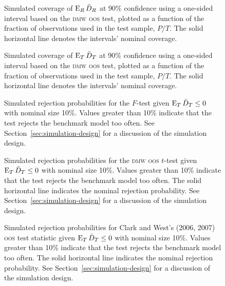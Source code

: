 \documentclass[11pt]{article}
\begin{document}
\clearpage
\begin{figure}
\caption{Simulated coverage of $\operatorname{E}_R \bar{D}_{R}$ at 90\% confidence using a
  one-sided interval based on the \protect\textsc{dmw}
  \protect\textsc{oos} test, plotted as a function of the fraction of
  observations used in the test sample, $P/T$.  The solid horizontal
  line denotes the intervals' nominal coverage.}
 \label{fig:interval-R}
\end{figure}
\clearpage
\begin{figure}
\caption{Simulated coverage of $\operatorname{E}_T \bar{D}_{T}$ at 90\% confidence using a
  one-sided interval based on the \protect\textsc{dmw}
  \protect\textsc{oos} test, plotted as a function of the fraction of
  observations used in the test sample, $P/T$.  The solid horizontal
  line denotes the intervals' nominal coverage.}
\label{fig:interval-T}
\end{figure}
\clearpage

\begin{figure}
  
  \caption{Simulated rejection probabilities for the $F$-test given
    $\operatorname{E}_T \bar{D}_{T} \leq 0$ with nominal size 10\%.  Values greater than
    10\% indicate that the test rejects the benchmark model too often.
    See Section~\ref{sec:simulation-design} for a discussion of the
    simulation design.}
  \label{fig:ftest}
\end{figure}
\clearpage
\begin{figure}
  \caption{Simulated rejection probabilities for the \protect\textsc{dmw}
    \protect\textsc{oos} $t$-test given $\operatorname{E}_T \bar{D}_{T} \leq 0$ with nominal
    size 10\%.  Values greater than 10\% indicate that the test
    rejects the benchmark model too often.  The solid horizontal line
    indicates the nominal rejection probability.  See
    Section~\ref{sec:simulation-design} for a discussion of the
    simulation design.}
  \label{fig:ttest-size}
\end{figure}

\begin{figure}
  
  \caption{Simulated rejection probabilities for Clark and West's
    (2006, 2007) \protect\textsc{oos} test statistic given $\operatorname{E}_T \bar{D}_{T}
    \leq 0$ with nominal size 10\%.  Values greater than 10\% indicate
    that the test rejects the benchmark model too often.  The solid
    horizontal line indicates the nominal rejection probability.  See
    Section~\ref{sec:simulation-design} for a discussion of the
    simulation design.}
   \label{fig:clarkwest}
\end{figure}
\end{document}
